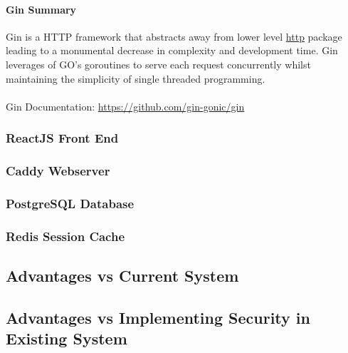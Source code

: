 \paragraph{Gin Summary}
Gin is a HTTP framework that abstracts away from lower level \href{https://pkg.go.dev/net/http}{http} package leading to a monumental decrease
in complexity and development time.
Gin leverages of GO's goroutines to serve each request concurrently whilst maintaining the simplicity of single threaded programming.

\paragraph{} Gin Documentation: \url{https://github.com/gin-gonic/gin}


\subsubsection{ReactJS Front End}

\subsubsection{Caddy Webserver}
\subsubsection{PostgreSQL Database}
\subsubsection{Redis Session Cache}

\subsection{Advantages vs Current System}\label{subsec:advantages-vs-current-system}

\subsection{Advantages vs Implementing Security in Existing System}\label{subsec:advantages-vs-implementing-security-in-existing-system}
\clearpage
\printglossaries